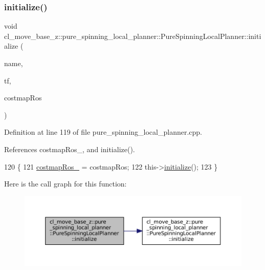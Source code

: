 \subsubsection{\texorpdfstring{initialize()}{initialize()}\hspace{0.1cm}{\footnotesize\ttfamily [2/3]}}
{\footnotesize\ttfamily void cl\+\_\+move\+\_\+base\+\_\+z\+::pure\+\_\+spinning\+\_\+local\+\_\+planner\+::\+Pure\+Spinning\+Local\+Planner\+::initialize (\begin{DoxyParamCaption}\item[{std\+::string}]{name,  }\item[{tf2\+\_\+ros\+::\+Buffer $\ast$}]{tf,  }\item[{costmap\+\_\+2d\+::\+Costmap2\+D\+R\+OS $\ast$}]{costmap\+Ros }\end{DoxyParamCaption})}



Definition at line 119 of file pure\+\_\+spinning\+\_\+local\+\_\+planner.\+cpp.



References costmap\+Ros\+\_\+, and initialize().


\begin{DoxyCode}
120 \{
121   \hyperlink{classcl__move__base__z_1_1pure__spinning__local__planner_1_1PureSpinningLocalPlanner_a63f75481071df118d56e8b652e68b002}{costmapRos\_} = costmapRos;
122   this->\hyperlink{classcl__move__base__z_1_1pure__spinning__local__planner_1_1PureSpinningLocalPlanner_a12fc5253f53f66e3e9735a72ebc9343f}{initialize}();
123 \}
\end{DoxyCode}
Here is the call graph for this function\+:
\nopagebreak
\begin{figure}[H]
\begin{center}
\leavevmode
\includegraphics[width=350pt]{classcl__move__base__z_1_1pure__spinning__local__planner_1_1PureSpinningLocalPlanner_ab28ef2ff04e7ec2b74068ea0fe3351d6_cgraph}
\end{center}
\end{figure}
\mbox{\label{classcl__move__base__z_1_1pure__spinning__local__planner_1_1PureSpinningLocalPlanner_a12fc5253f53f66e3e9735a72ebc9343f}} 
